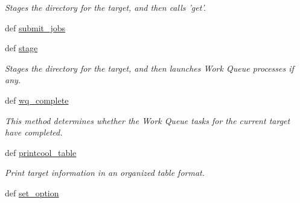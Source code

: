 \begin{DoxyCompactItemize}
\begin{DoxyCompactList}\small\item\em Stages the directory for the target, and then calls 'get'. \end{DoxyCompactList}\item 
def \hyperlink{classforcebalance_1_1target_1_1Target_a78cd29b94cbcc201eed99c78aaef46a4}{submit\-\_\-jobs}
\item 
def \hyperlink{classforcebalance_1_1target_1_1Target_af8d2a4658c87841e40296795aec478bb}{stage}
\begin{DoxyCompactList}\small\item\em Stages the directory for the target, and then launches Work Queue processes if any. \end{DoxyCompactList}\item 
def \hyperlink{classforcebalance_1_1target_1_1Target_af6099ec09486213869dba2491bd8ea04}{wq\-\_\-complete}
\begin{DoxyCompactList}\small\item\em This method determines whether the Work Queue tasks for the current target have completed. \end{DoxyCompactList}\item 
def \hyperlink{classforcebalance_1_1target_1_1Target_ac30a4e9d7d9fe06f7caefa5f7cfab09b}{printcool\-\_\-table}
\begin{DoxyCompactList}\small\item\em Print target information in an organized table format. \end{DoxyCompactList}\item 
def \hyperlink{classforcebalance_1_1BaseClass_a73e9a37a7632e79eb99f49bd15aced45}{set\-\_\-option}
\end{DoxyCompactItemize}
